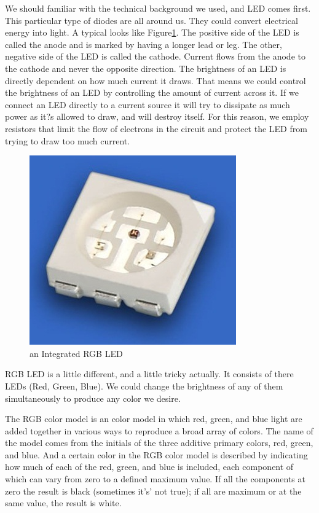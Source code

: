\documentclass[12pt,a4paper,journal]{IEEEtran}
\begin{document}
We should familiar with the technical background we used, and LED comes first. This particular type of diodes are all around us. They could convert electrical energy into light. A typical looks like Figure\ref{fig:rgbled}. The positive side of the LED is called the anode and is marked by having a longer lead or leg. The other, negative side of the LED is called the cathode. Current flows from the anode to the cathode and never the opposite direction. The brightness of an LED is directly dependent on how much current it draws. That means we could control the brightness of an LED by controlling the amount of current across it. If we connect an LED directly to a current source it will try to dissipate as much power as it?s allowed to draw, and will destroy itself. For this reason, we employ resistors that limit the flow of electrons in the circuit and protect the LED from trying to draw too much current.
\begin{figure}[ht]
  \centering
  \includegraphics[width=0.9\linewidth]{rgbled.jpg}
  \caption{an Integrated RGB LED}
  \label{fig:rgbled}
\end{figure}
RGB LED is a little different, and a little tricky actually. It consists of there LEDs (Red, Green, Blue). We could change the brightness of any of them simultaneously to produce any color we desire.

The RGB color model is an color model in which red, green, and blue light are added together in various ways to reproduce a broad array of colors. The name of the model comes from the initials of the three additive primary colors, red, green, and blue. And a certain color in the RGB color model is described by indicating how much of each of the red, green, and blue is included, each component of which can vary from zero to a defined maximum value. If all the components at zero the result is black (sometimes it's' not true); if all are maximum or at the same value, the result is white. 
\end{document}
